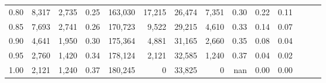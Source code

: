 \begin{tabular}{rrrrrrrrrrrrrr}
0.80 &   8,317 &  2,735 &  0.25 &  163,030 &   17,215 &  26,474 &   7,351 &  0.30 &  0.22 &      0.11 \\
0.85 &   7,693 &  2,741 &  0.26 &  170,723 &    9,522 &  29,215 &   4,610 &  0.33 &  0.14 &      0.07 \\
0.90 &   4,641 &  1,950 &  0.30 &  175,364 &    4,881 &  31,165 &   2,660 &  0.35 &  0.08 &      0.04 \\
0.95 &   2,760 &  1,420 &  0.34 &  178,124 &    2,121 &  32,585 &   1,240 &  0.37 &  0.04 &      0.02 \\
1.00 &   2,121 &  1,240 &  0.37 &  180,245 &        0 &  33,825 &       0 &   nan &  0.00 &      0.00 \\
\bottomrule
\end{tabular}
